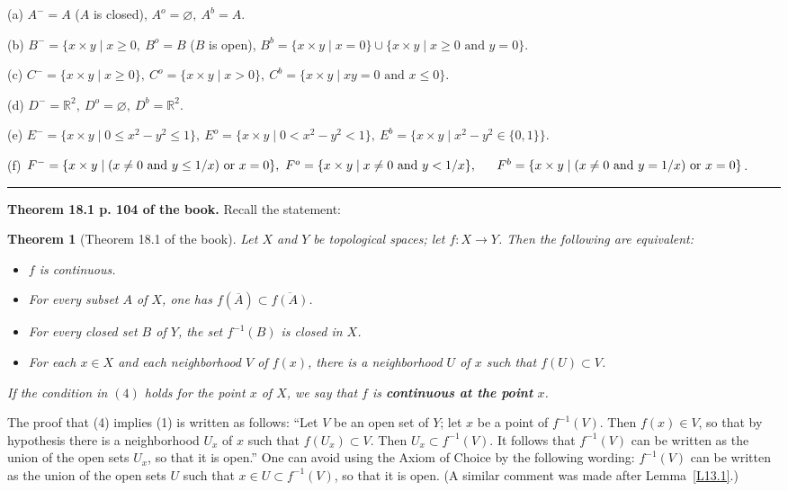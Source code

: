 \documentclass[12pt,letterpaper]{article}
\newtheorem{thm}{Theorem}%
\newcommand{\hs}{\bigskip\hrule\medskip}
\newcommand{\noi}{\noindent}%
\newcommand{\R}{\mathbb R}
\begin{document}
\noi(a) $A^-=A$ ($A$ is closed), $A^o=\varnothing,\ A^b=A$. 

\noi(b) $B^-=\{x\times y\mid x\ge0,\ B^o=B$ ($B$ is open), $B^b=\{x\times y\mid x=0\}\cup\{x\times y\mid x\ge0\text{ and }y=0\}$. 

\noi(c) $C^-=\{x\times y\mid x\ge0\},\ C^o=\{x\times y\mid x>0\},\ C^b=\{x\times y\mid xy=0\text{ and }x\le0\}$. 

\noi(d) $D^-=\R^2,\ D^o=\varnothing,\ D^b=\R^2$. 

\noi(e) $E^-=\{x\times y\mid 0\le x^2-y^2\le1\},\ E^o=\{x\times y\mid 0<x^2-y^2<1\},\ E^b=\{x\times y\mid x^2-y^2\in\{0,1\}\}$. 

\noi(f) $F^-=\{x\times y\mid(x\neq 0\text{ and }y\leq1/x)\text{ or }x=0\},\ F^o=\{x\times y\mid x\neq 0\text{ and }y<1/x\},\\{}\hskip16pt F^b=\{x\times y\mid(x\neq 0\text{ and }y=1/x)\text{ or }x=0\}$. 

\hs 

\noi\textbf{Theorem 18.1 p. 104 of the book.} Recall the statement:

\begin{thm}[Theorem 18.1 of the book] 
Let $X$ and $Y$ be topological spaces; let $f: X \to Y$. Then the following are equivalent:
\begin{itemize}
    \item[$(1)$] $f$ is continuous.
    \item[$(2)$] For every subset $A$ of $X$, one has $f(\overline{A}) \subset \overline{f(A)}$.
    \item[$(3)$] For every closed set $B$ of $Y$, the set $f^{-1}(B)$ is closed in $X$.
    \item[$(4)$] For each $x \in X$ and each neighborhood $V$ of $f(x)$, there is a neighborhood $U$ of $x$ such that $f(U) \subset V$.
\end{itemize}
If the condition in $(4)$ holds for the point $x$ of $X$, we say that $f$ is \textbf{continuous at the point} $x$.
\end{thm} %

The proof that (4) implies (1) is written as follows: ``Let $V$ be an open set of $Y$; let $x$ be a point of $f^{-1}(V)$. Then $f(x) \in V$, so that by hypothesis there is a neighborhood $U_x$ of $x$ such that $f(U_x) \subset V$. Then $U_x \subset f^{-1}(V)$. It follows that $f^{-1}(V)$ can be written as the union of the open sets $U_x$, so that it is open.'' One can avoid using the Axiom of Choice by the following wording: $f^{-1}(V)$ can be written as the union of the open sets $U$ such that $x\in U\subset f^{-1}(V)$, so that it is open. (A similar comment was made after Lemma~\ref{L13.1}.) 
\end{document}
